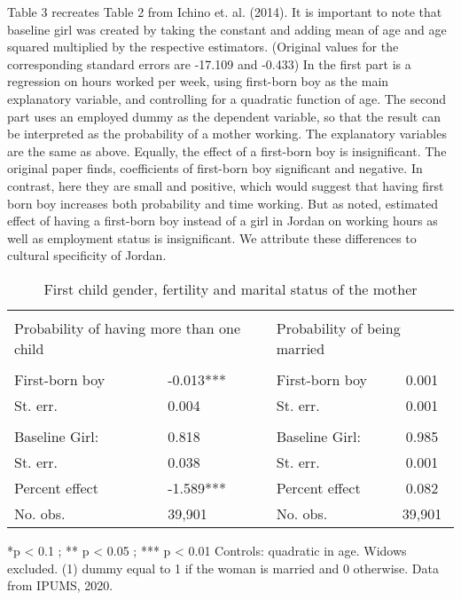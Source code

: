 \documentclass[12pt,draft,a4paper]{article}
\begin{document}
Table 3 recreates Table 2 from Ichino et. al. (2014). It is important to note that baseline girl was created by taking the constant and adding mean of age and age squared multiplied by the respective estimators. 
(Original values for the corresponding standard errors are -17.109 and -0.433) 
In the first part is a regression on hours worked per week, using first-born boy as the main explanatory variable, and controlling for a quadratic function of age. 
The second part uses an employed dummy as the dependent variable, so that the result can be interpreted as the probability of a mother working. 
The explanatory variables are the same as above. Equally, the effect of a first-born boy is insignificant.
The original paper finds, coefficients of first-born boy significant and negative. In contrast, here they are small and positive, which would suggest that having first born boy increases both probability and time working. 
But as noted, estimated effect of having a first-born boy instead of a girl in Jordan on working hours as well as employment status is insignificant. We attribute these differences to cultural specificity of Jordan.
    

\begin{table}[bp]%
    \caption{First child gender, fertility and marital status of the mother}

    
    \begin{tabularx}{\textwidth}{lXlc}
    
    \hline & \\[-1.0em]
    \multicolumn{2}{l}{Probability of having more than one child}  & \multicolumn{2}{l}{Probability of being married} \\
    \hline & \\[-1.0em]
        First-born boy & -0.013***  & First-born boy  & 0.001   \\
        St. err.       & 0.004      & St. err.        & 0.001   \\
        \\[-1.0em]                                                     
        Baseline Girl: & 0.818      & Baseline Girl:  & 0.985   \\
        St. err.       & 0.038      & St. err.        & 0.001   \\
        Percent effect & -1.589***  & Percent effect  & 0.082   \\
        No. obs.       & 39,901     & No. obs.        & 39,901 \\
    \hline
    \end{tabularx}

    *p < 0.1 ; ** p < 0.05 ; *** p < 0.01 Controls: quadratic in age. Widows excluded. (1) dummy equal to 1 if the woman is married and 0 otherwise. Data from IPUMS, 2020.
    \label{tab:fert}
    \end{table}
    
\end{document}
